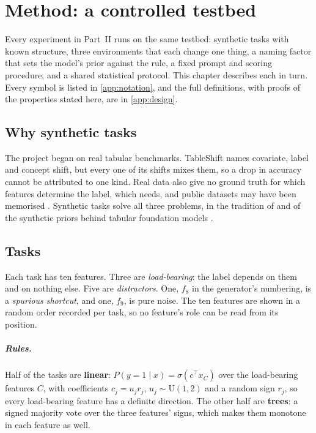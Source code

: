 \chapter{Method: a controlled testbed}
\label{ch:method}

Every experiment in Part~II runs on the same testbed: synthetic tasks with known structure, three environments that each change one thing, a naming factor that sets the model's prior against the rule, a fixed prompt and scoring procedure, and a shared statistical protocol.
This chapter describes each in turn. Every symbol is listed in \autoref{app:notation}, and the full definitions, with proofs of the properties stated here, are in \autoref{app:design}.

\section{Why synthetic tasks}
\label{sec:why-synthetic}

The project began on real tabular benchmarks.
TableShift \citep{gardner2023tableshift} names covariate, label and concept shift, but every one of its shifts mixes them, so a drop in accuracy cannot be attributed to one kind.
Real data also give no ground truth for which features determine the label, which  needs, and public datasets may have been memorised \citep{bordt2024elephants}.
Synthetic tasks solve all three problems, in the tradition of \citet{garg2022what} and of the synthetic priors behind tabular foundation models \citep{muller2022transformers,hollmann2023tabpfn}.

\section{Tasks}
\label{sec:tasks}

Each task has ten features.
Three are \emph{load-bearing}: the label depends on them and on nothing else.
Five are \emph{distractors}.
One, $f_8$ in the generator's numbering, is a \emph{spurious shortcut}, and one, $f_9$, is pure noise.
The ten features are shown in a random order recorded per task, so no feature's role can be read from its position.

\paragraph{Rules.}
Half of the tasks are \textbf{linear}: $P(y = 1 \mid x) = \sigma(c^\top x_C)$ over the load-bearing features $C$, with coefficients $c_j = u_j r_j$, $u_j \sim \mathrm{U}(1,2)$ and a random sign $r_j$, so every load-bearing feature has a definite direction.
The other half are \textbf{trees}: a signed majority vote over the three features' signs, which makes them monotone in each feature as well.

